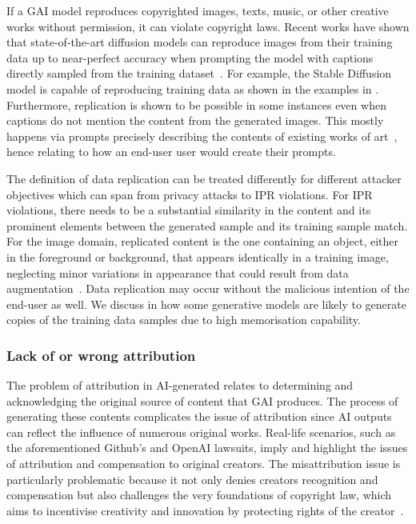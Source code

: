 \documentclass[conference]{IEEEtran}
\begin{document}
If a GAI model reproduces copyrighted images, texts, music, or other creative works without permission, it can violate copyright laws. 
Recent works have shown that state-of-the-art diffusion models can reproduce images from their training data up to near-perfect accuracy when prompting the model with captions directly sampled from the training dataset~\cite{somepalli_diffusion_2022,carlini_extracting_2023}. 
For example, the Stable Diffusion model is capable of reproducing training data as shown in the examples in .
Furthermore, replication is shown to be possible in some instances even when captions do not mention the content from the generated images. 
This mostly happens via prompts precisely describing the contents of existing works of art~\cite{somepalli_understanding_2023}, hence relating to how an end-user user would create their prompts. %

The definition of data replication can be treated differently for different attacker objectives which can span from privacy attacks to IPR violations. 
For IPR violations, there needs to be a substantial similarity in the content and its prominent elements between the generated sample and its training sample match.
For the image domain, replicated content is the one containing an object, either in the foreground or background, that appears identically in a training image, neglecting minor variations in appearance that could result from data augmentation~\cite{somepalli_diffusion_2022}.
Data replication may occur without the malicious intention of the end-user as well. 
We discuss in  how some generative models are likely to generate copies of the training data samples due to high memorisation capability. 

\subsubsection{Lack of or wrong attribution} 
The problem of attribution in AI-generated relates to determining and acknowledging the original source of content that GAI produces. The process of generating these contents complicates the issue of attribution since AI outputs can reflect the influence of numerous original works. 
Real-life scenarios, such as the aforementioned Github's and OpenAI lawsuits, imply and highlight the issues of attribution and compensation to original creators. 
The misattribution issue is particularly problematic because it not only denies creators recognition and compensation but also challenges the very foundations of copyright law, which aims to incentivise creativity and innovation by protecting rights of the creator~\cite{ulku_kahveci_attribution_2023}.
\end{document}
